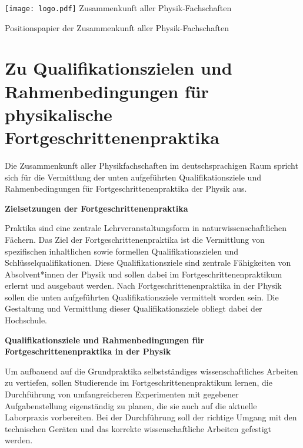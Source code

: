 ﻿\documentclass[DIV=calc]{scrartcl}
\begin{document}
    \hspace{0.87\textwidth}
    \begin{minipage}{120pt}
        \vspace{-1.8cm}
        \texttt{[image: logo.pdf]}
        \centering
        \small Zusammenkunft aller Physik-Fachschaften
    \end{minipage}
    \begin{center}
        \huge{Positionspapier der Zusammenkunft aller Physik-Fachschaften}\vspace{.25\baselineskip}\\
        \normalsize
    \end{center}
    \vspace{0.1cm}

\section*{Zu Qualifikationszielen und Rahmenbedingungen für physikalische Fortgeschrittenenpraktika}


Die Zusammenkunft aller Physikfachschaften im deutschsprachigen Raum spricht sich für die Vermittlung der unten aufgeführten Qualifikationsziele und Rahmenbedingungen für Fortgeschrittenenpraktika der Physik aus.

\textbf{Zielsetzungen der Fortgeschrittenenpraktika}

Praktika sind eine zentrale Lehrveranstaltungsform in naturwissenschaftlichen Fächern. Das Ziel der Fortgeschrittenenpraktika ist die Vermittlung von spezifischen inhaltlichen sowie formellen Qualifikationszielen und Schlüsselqualifikationen. Diese Qualifikationsziele sind zentrale Fähigkeiten von Absolvent*innen der Physik und sollen dabei im Fortgeschrittenenpraktikum erlernt und ausgebaut werden. Nach  Fortgeschrittenenpraktika in der Physik sollen die unten aufgeführten Qualifikationsziele vermittelt worden sein. Die Gestaltung und Vermittlung dieser Qualifikationsziele obliegt dabei der Hochschule.

\textbf{Qualifikationsziele und Rahmenbedingungen für Fortgeschrittenenpraktika in der Physik}

Um aufbauend auf die Grundpraktika selbstständiges wissenschaftliches Arbeiten zu vertiefen, sollen Studierende im Fortgeschrittenenpraktikum lernen, die Durchführung von umfangreicheren Experimenten mit gegebener Aufgabenstellung eigenständig zu planen, die sie auch auf die aktuelle Laborpraxis vorbereiten. Bei der Durchführung soll der richtige Umgang mit den technischen Geräten und das korrekte wissenschaftliche Arbeiten gefestigt werden.\\[-0.25cm]
\end{document}
